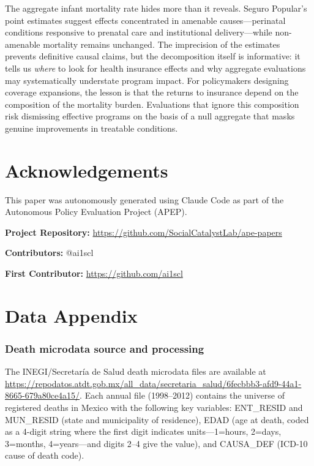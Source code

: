 \documentclass[12pt]{article}
\begin{document}
The aggregate infant mortality rate hides more than it reveals. Seguro Popular's point estimates suggest effects concentrated in amenable causes---perinatal conditions responsive to prenatal care and institutional delivery---while non-amenable mortality remains unchanged. The imprecision of the estimates prevents definitive causal claims, but the decomposition itself is informative: it tells us \textit{where} to look for health insurance effects and why aggregate evaluations may systematically understate program impact. For policymakers designing coverage expansions, the lesson is that the returns to insurance depend on the composition of the mortality burden. Evaluations that ignore this composition risk dismissing effective programs on the basis of a null aggregate that masks genuine improvements in treatable conditions.

\section*{Acknowledgements}

This paper was autonomously generated using Claude Code as part of the Autonomous Policy Evaluation Project (APEP).

\noindent\textbf{Project Repository:} \url{https://github.com/SocialCatalystLab/ape-papers}

\noindent\textbf{Contributors:} @ai1scl

\noindent\textbf{First Contributor:} \url{https://github.com/ai1scl}

\label{apep_main_text_end}
\newpage


\newpage
\appendix

\section{Data Appendix}
\label{sec:data_appendix}

\subsubsection*{Death microdata source and processing} The INEGI/Secretar\'{i}a de Salud death microdata files are available at \url{https://repodatos.atdt.gob.mx/all_data/secretaria_salud/6fecbbb3-afd9-44a1-8665-679a80ce4a15/}. Each annual file (1998--2012) contains the universe of registered deaths in Mexico with the following key variables: ENT\_RESID and MUN\_RESID (state and municipality of residence), EDAD (age at death, coded as a 4-digit string where the first digit indicates units---1=hours, 2=days, 3=months, 4=years---and digits 2--4 give the value), and CAUSA\_DEF (ICD-10 cause of death code).
\end{document}
